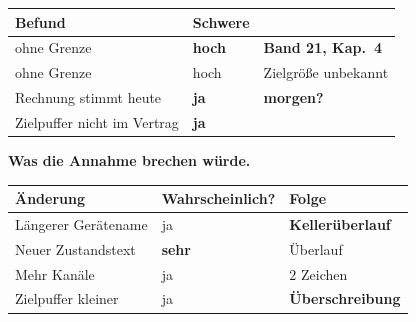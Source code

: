 \begin{merksatz}
\begin{center}
{\small
\renewcommand{\arraystretch}{1.45}
\begin{tabular}{@{}P{3.0cm}P{2.2cm}P{2.6cm}@{}}
\toprule
\textbf{Befund} & \textbf{Schwere} & \\
\midrule
{} ohne Grenze & \textcolor{akzent}{\textbf{hoch}} & \textbf{Band 21, Kap.~4}\\
 ohne Grenze & \textcolor{akzent}{hoch} & \textcolor{akzent}{Zielgröße unbekannt}\\
Rechnung stimmt heute & \textcolor{mittel}{\textbf{ja}} & \textcolor{akzent}{\textbf{morgen?}}\\
Zielpuffer nicht im Vertrag & \textcolor{akzent}{\textbf{ja}} & \\
\bottomrule
\end{tabular}}
\end{center}

\begin{center}
\begin{minipage}{0.88\textwidth}
\end{minipage}
\end{center}

\textbf{Was die Annahme brechen würde.}

\begin{center}
\renewcommand{\arraystretch}{1.45}
\begin{tabular}{@{}P{3.0cm}P{2.6cm}P{2.2cm}@{}}
\toprule
\textbf{Änderung} & \textbf{Wahr\-scheinlich?} & \textbf{Folge}\\
\midrule
Längerer Gerätename & \textcolor{mittel}{ja} & \textcolor{akzent}{\textbf{Keller\-überlauf}}\\
Neuer Zustandstext & \textcolor{gruen}{\textbf{sehr}} & \textcolor{akzent}{Überlauf}\\
Mehr Kanäle & \textcolor{mittel}{ja} & \textcolor{mittel}{$2$ Zeichen}\\
Zielpuffer kleiner & \textcolor{mittel}{ja} & \textcolor{akzent}{\textbf{Über\-schreibung}}\\
\bottomrule
\end{tabular}
\end{center}

\begin{center}
\end{center}
\end{merksatz}

